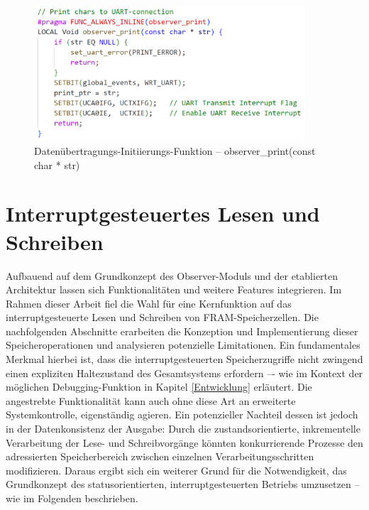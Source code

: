 \begin{figure}[h!]
	\centering
	\includegraphics[width=0.9\textwidth]{../Bilder/ObserverModule/observer_print.png}
	\caption{Daten\"ubertragungs-Initiierungs-Funktion -- observer\_print(const char * str)}
	\label{fig:observer_print}
\end{figure}


\newpage
\section{Interruptgesteuertes Lesen und Schreiben}
\label{Interruptgesteuertes_Lesen&Schreiben}

Aufbauend auf dem Grundkonzept des Observer-Moduls und der etablierten Architektur lassen sich Funktionalit\"aten und weitere Features integrieren. Im Rahmen dieser Arbeit fiel die Wahl f\"ur eine Kernfunktion auf das interruptgesteuerte Lesen und Schreiben von FRAM-Speicherzellen. Die nachfolgenden Abschnitte erarbeiten die Konzeption und Implementierung dieser Speicheroperationen und analysieren potenzielle Limitationen. Ein fundamentales Merkmal hierbei ist, dass die interruptgesteuerten Speicherzugriffe nicht zwingend einen expliziten Haltezustand des Gesamtsystems erfordern –- wie im Kontext der m\"oglichen Debugging-Funktion in Kapitel \ref{Entwicklung} erl\"autert. Die angestrebte Funktionalit\"at kann auch ohne diese Art an erweiterte Systemkontrolle, eigenst\"andig agieren. Ein potenzieller Nachteil dessen ist jedoch in der Datenkonsistenz der Ausgabe: Durch die zustandsorientierte, inkrementelle Verarbeitung der Lese- und Schreibvorg\"ange k\"onnten konkurrierende Prozesse den adressierten Speicherbereich zwischen einzelnen Verarbeitungsschritten modifizieren. Daraus ergibt sich ein weiterer Grund f\"ur die Notwendigkeit, das Grundkonzept des statusorientierten, interruptgesteuerten Betriebs umzusetzen – wie im Folgenden beschrieben.

